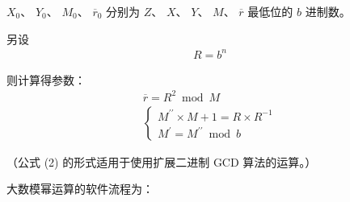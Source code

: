 \documentclass[main\_\_CN.tex]{subfiles}
\begin{document}
\begin{math}X_{0}\end{math}、
\begin{math}Y_{0}\end{math}、
\begin{math}M_{0}\end{math}、
\begin{math}\overline{r}_{0}\end{math}
分别为
\begin{math}Z\end{math}、
\begin{math}X\end{math}、
\begin{math}Y\end{math}、
\begin{math}M\end{math}、
\begin{math}\overline{r}\end{math}
最低位的 \begin{math}b\end{math} 进制数。

另设
\begin{gather*}
    R = b^{n}
\end{gather*}

则计算得参数：
\begin{gather}
    \overline{r} = R^{2} \bmod M \label{equation:r_bar} \\
    \begin{cases}
        \displaystyle M^{\prime\prime} \times M + 1 = R \times R^{-1} \\
        \displaystyle M^{\prime} = M^{\prime\prime} \bmod b
    \end{cases} \label{equation:M_prime}
\end{gather}


（公式 (2) 的形式适用于使用扩展二进制 GCD 算法的运算。）

大数模幂运算的软件流程为：
\end{document}
